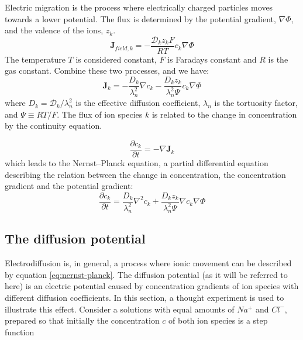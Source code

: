 \documentclass{article}
\begin{document}
Electric migration is the process where electrically charged particles moves towards a lower potential. The flux is determined by the potential gradient, $\nabla \Phi$,  and the valence of the ions, $z_k$. 
\begin{equation}\label{eq:field}
\bm{J}_{field,k} = -\frac{\mathcal{D}_kz_kF}{RT} c_k\nabla \Phi
\end{equation}
The temperature $T$ is considered constant, $F$ is Faradays constant and $R$ is the gas constant. Combine these two processes, and we have:
 \begin{equation}\label{eq:eldiff flux}
\bm{J}_k = -\frac{D_k}{\lambda_n^2}\nabla c_k -\frac{D_k z_k}{\lambda_n^2 \Psi}c_k  \nabla \Phi
\end{equation}
where $D_k =\mathcal{D}_k/\lambda_n^2$ is the effective diffusion coefficient, $\lambda_n$ is the tortuosity factor, and $\Psi \equiv RT/F$.
The flux of ion species $k$ is related to the change in concentration by the continuity equation. 

\begin{equation}\label{eq:continuity}
\frac{\partial c_k}{\partial t} = -\nabla \bm{J}_k
\end{equation}
which leads to the Nernst--Planck equation, a partial differential equation describing the relation between the change in concentration, the concentration gradient and the potential gradient:
 \begin{equation}\label{eq:nernst-planck}
\frac{\partial c_k}{\partial t}  = \frac{D_k}{\lambda_n^2}\nabla^2 c_k +\frac{D_k z_k}{\lambda_n^2 \Psi}\nabla c_k  \nabla \Phi
\end{equation}


\subsection{The diffusion potential}
Electrodiffusion is, in general, a process where ionic movement can be described by equation \ref{eq:nernst-planck}. The diffusion potential (as it will be referred to here) is an electric potential caused by concentration gradients of ion species with different diffusion coefficients. In this section, a thought experiment is used to illustrate this effect.
Consider a solutions with equal amounts of $Na^+$ and $Cl^-$, prepared so that initially the concentration $c$ of both ion species is a step function 
\end{document}
